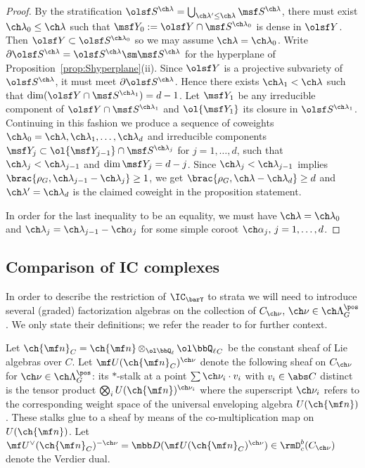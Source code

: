 \documentclass[final]{amsart}
\theoremstyle{remark}
\theoremstyle{definition}
\DeclareMathOperator*{\ot}{\otimes}
\numberwithin{equation}{section}
\begin{document}
\begin{proof}
By the stratification $\olsf S^{\ch\lambda} = \bigcup_{\ch\lambda'\le\ch\lambda} \msf S^{\ch\lambda}$,
there must exist $\ch\lambda_0 \le \ch\lambda$ such that 
$\msf Y_0 := \olsf Y \cap \msf S^{\ch\lambda_0}$ is dense in $\olsf Y$. 
Then $\olsf Y \subset \olsf S^{\ch\lambda_0}$ so we may assume $\ch\lambda=\ch\lambda_0$. 
Write $\partial \olsf S^{\ch\lambda} = \olsf S^{\ch\lambda} \sm \msf S^{\ch\lambda}$ for the hyperplane of Proposition~\ref{prop:Shyperplane}(ii). 
Since $\olsf Y$ is a projective subvariety of $\olsf S^{\ch\lambda}$, it must
 meet $\partial \olsf S^{\ch\lambda}$. 
Hence there exists $\ch\lambda_1 < \ch\lambda$ such that
$\dim(\olsf Y \cap \msf S^{\ch\lambda_1}) = d-1$. 
Let $\msf Y_1$ be any irreducible component of $\olsf Y\cap \msf S^{\ch\lambda_1}$ and 
$\ol{\msf Y_1}$ its closure in $\olsf S^{\ch\lambda_1}$. 
Continuing in this fashion we produce a sequence of coweights $\ch\lambda_0=\ch\lambda, \ch\lambda_1,\dotsc,\ch\lambda_d$ and irreducible components $\msf Y_j \subset \ol{\msf Y_{j-1}}\cap \msf S^{\ch\lambda_j}$ for $j=1,\dotsc,d$, such that $\ch\lambda_j < \ch\lambda_{j-1}$ and 
$\dim \msf Y_j = d-j$. 
Since $\ch\lambda_j < \ch\lambda_{j-1}$ implies $\brac{\rho_G,\ch\lambda_{j-1}-\ch\lambda_j}\ge 1$, 
we get $\brac{\rho_G,\ch\lambda-\ch\lambda_d} \ge d$ and $\ch\lambda'=\ch\lambda_d$ is the claimed
coweight in the proposition statement. 

In order for the last inequality to be an equality, we must have $\ch\lambda=\ch\lambda_0$
and $\ch\lambda_j = \ch\lambda_{j-1} - \ch\alpha_j$ for some simple coroot $\ch\alpha_j,\, j=1,\dotsc,d$. 
\end{proof}

 


\subsection{Comparison of IC complexes} \label{sect:compareIC}
In order to describe the restriction of $\IC_{\barY}$ to strata 
we will need to introduce several (graded) factorization algebras on the
collection of $C_{\ch\nu},\, \ch\nu\in\ch\Lambda^\pos_G$. 
We only state their definitions; we refer the reader to \cite{BG2, G:whatacts} for
further context.

\smallskip

Let $\ch{\mf n}_C = \ch{\mf n} \ot_{\ol\bbQ_\ell} {\ol\bbQ_\ell}_C$ be the constant sheaf of 
Lie algebras over $C$. 
Let $\mf U(\ch{\mf n}_C)^{\ch\nu}$ denote the following sheaf on $C_{\ch\nu}$
for $\ch\nu \in \ch\Lambda^\pos_G$: its $*$-stalk at a point $\sum \ch\nu_i \cdot v_i$
with $v_i \in \abs C$ distinct is the tensor product $\bigotimes_i U(\ch{\mf n})^{\ch\nu_i}$
where the superscript $\ch\nu_i$ refers to the corresponding weight space of 
the universal enveloping algebra $U(\ch{\mf n})$. 
These stalks glue to a sheaf by means of the co-multiplication map on $U(\ch{\mf n})$. 
Let $\mf U^\vee(\ch{\mf n}_C)^{-\ch\nu} = \mbb D (\mf U(\ch{\mf n}_C)^{\ch\nu}) \in \rmD^b_c(C_{\ch\nu})$ denote the Verdier dual. 
\end{document}
